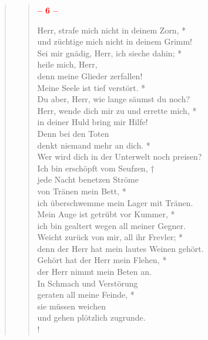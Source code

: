 \begin{quote}
\begin{verse}
\begin{center}
 \textcolor{red}{\normalsize\bf – 6 –}\\
\end{center}

\smallskip

Herr, strafe mich nicht in deinem Zorn, *\\
und züchtige mich nicht in deinem Grimm!\\
\vin Sei mir gnädig, Herr, ich sieche dahin; *\\
\vin heile mich, Herr,\\
\vin denn meine Glieder zerfallen!\\
Meine Seele ist tief verstört. *\\
Du aber, Herr, wie lange säumst du noch?\\
\vin Herr, wende dich mir zu und errette mich, *\\
\vin in deiner Huld bring mir Hilfe!\\
Denn bei den Toten\\
denkt niemand mehr an dich. *\\
Wer wird dich in der Unterwelt noch preisen?\\
\vin Ich bin erschöpft vom Seufzen, †\\
\vin jede Nacht benetzen Ströme\\
\vin von Tränen mein Bett, *\\
\vin ich überschwemme mein Lager mit Tränen.\\
Mein Auge ist getrübt vor Kummer, *\\
ich bin gealtert wegen all meiner Gegner.\\
\vin Weicht zurück von mir, all ihr Frevler; *\\
\vin denn der Herr hat mein lautes Weinen gehört.\\
Gehört hat der Herr mein Flehen, *\\
der Herr nimmt mein Beten an.\\
\vin In Schmach und Verstörung\\
\vin geraten all meine Feinde, *\\
\vin sie müssen weichen\\
\vin und gehen plötzlich zugrunde.\\!

\end{verse}
\end{quote}